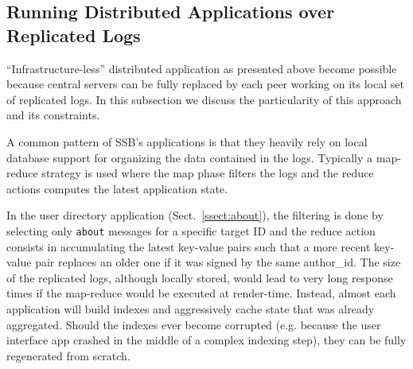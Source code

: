 \documentclass[9pt,sigconf]{acmart}
\begin{document}


\subsection{Running Distributed Applications over Replicated Logs}
\label{ssect:dapps}

``Infrastructure-less'' distributed application as presented above
become possible because central servers can be fully replaced by each
peer working on its local set of replicated logs. In this subsection
we discuss the particularity of this approach and its constraints.

A common pattern of SSB's applications is that they heavily rely
on local database support for organizing the data contained in the logs.
Typically a map-reduce strategy is used where the map phase filters
the logs and the reduce actions computes the latest application state.

In the user directory application (Sect.~\ref{ssect:about}), the filtering is
done by selecting only {\tt about} messages for a specific target ID
and the reduce action consists in accumulating the latest key-value
pairs such that a more recent key-value pair replaces an older one if
it was signed by the same author\_id. The size of the replicated logs,
although locally stored, would lead to very long response times if the
map-reduce would be executed at render-time. Instead, almost each
application will build indexes and aggressively cache state that was
already aggregated. Should the indexes ever become corrupted
(e.g. because the user interface app crashed in the middle of a
complex indexing step), they can be fully regenerated from scratch.
\end{document}
